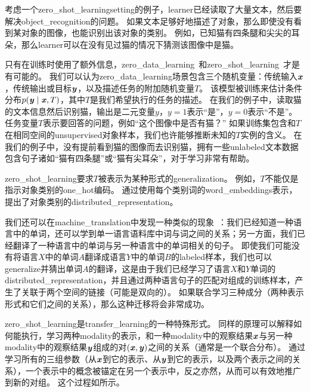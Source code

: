 考虑一个\gls{zero_shot_learning}\gls{setting}的例子，\gls{learner}已经读取了大量文本，然后要解决\gls{object_recognition}的问题。
如果文本足够好地描述了对象，那么即使没有看到某对象的图像，也能识别出该对象的类别。
例如，已知猫有四条腿和尖尖的耳朵，那么\gls{learner}可以在没有见过猫的情况下猜测该图像中是猫。



只有在训练时使用了额外信息，\gls{zero_data_learning}~\citep{Larochelle2008}和\gls{zero_shot_learning}~\citep{Palatucci2009,Socher-2013}才是有可能的。
我们可以认为\gls{zero_data_learning}场景包含三个随机变量：传统输入$\boldsymbol{\mathit{x}}$，传统输出或目标$\boldsymbol{\mathit{y}}$，以及描述任务的附加随机变量$T$。
该模型被训练来估计条件分布$p(\boldsymbol{\mathit{y}} \mid \boldsymbol{\mathit{x}}, T)$，其中$T$是我们希望执行的任务的描述。
在我们的例子中，读取猫的文本信息然后识别猫，输出是二元变量$y$，$y=1$表示``是''，$y=0$表示``不是''。
任务变量$T$表示要回答的问题，例如``这个图像中是否有猫？''
如果训练集包含和$T$在相同空间的\gls{unsupervised}对象样本，我们也许能够推断未知的$T$实例的含义。
在我们的例子中，没有提前看到猫的图像而去识别猫，拥有一些\gls{unlabeled}文本数据包含句子诸如``猫有四条腿''或``猫有尖耳朵''，对于学习非常有帮助。


\gls{zero_shot_learning}要求$T$被表示为某种形式的\gls{generalization}。
例如，$T$不能仅是指示对象类别的\gls{one_hot}编码。
通过使用每个类别词的\gls{word_embeddings}表示，\cite{Socher-2013}提出了对象类别的\gls{distributed_representation}。


我们还可以在\gls{machine_translation}中发现一种类似的现象~\citep{Klementiev-et-al-COLING2012,Mikolov-et-al-arxiv2013,Gouws-et-al-arxiv2014}：我们已经知道一种语言中的单词，还可以学到单一语言语料库中词与词之间的关系；另一方面，我们已经翻译了一种语言中的单词与另一种语言中的单词相关的句子。
即使我们可能没有将语言$X$中的单词$A$翻译成语言$Y$中的单词$B$的\gls{labeled}样本，我们也可以\gls{generalize}并猜出单词$A$的翻译，这是由于我们已经学习了语言$X$和$Y$单词的\gls{distributed_representation}，并且通过两种语言句子的匹配对组成的训练样本，产生了关联于两个空间的链接（可能是双向的）。
如果联合学习三种成分（两种表示形式和它们之间的关系），那么这种迁移将会非常成功。


\gls{zero_shot_learning}是\gls{transfer_learning}的一种特殊形式。
同样的原理可以解释如何能执行，学习两种\gls{modality}的表示，和一种\gls{modality}中的观察结果$\boldsymbol{\mathit{x}}$与另一种\gls{modality}中的观察结果$\boldsymbol{\mathit{y}}$组成的对$(\boldsymbol{\mathit{x}}, \boldsymbol{\mathit{y}})$之间的关系（通常是一个联合分布）\citep{Srivastava+Salakhutdinov-NIPS2012-small}。
通过学习所有的三组参数（从$\boldsymbol{\mathit{x}}$到它的表示、从$\boldsymbol{\mathit{y}}$到它的表示，以及两个表示之间的关系），一个表示中的概念被锚定在另一个表示中，反之亦然，从而可以有效地推广到新的对组。 %
这个过程如所示。


